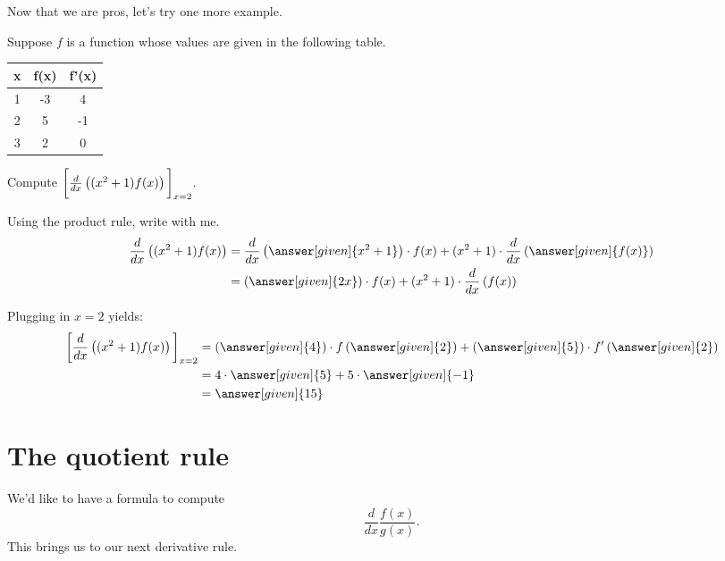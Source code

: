 \documentclass{ximera}
\begin{document}
Now that we are pros, let's try one more example.


\begin{example}
	Suppose $f$ is a function whose values are given in the following table.
	\begin{center}
		\begin{tabular}{c c c}
			\hline \hline
			x & f(x) & f'(x) \\ 
			\hline
			1 & -3 & 4\\
			2 & 5 & -1\\
			3 & 2 & 0\\
			\hline
		\end{tabular}		
	\end{center}
		
	Compute $\bigg[  \frac{d}{dx}\left( (x^2+1) f(x) \right) \bigg]_{x=2}$.
	\begin{explanation}
	Using the product rule, write with me.
	\begin{align*}
		\frac{d}{dx}\left( (x^2+1) f(x) \right) &= \frac{d}{dx} \left( \answer[given]{x^2+1} \right) \cdot f(x) + (x^2+1) \cdot \frac{d}{dx}\left( \answer[given]{f(x)} \right) \\
			&= \left( \answer[given]{2x} \right) \cdot f(x) + (x^2+1) \cdot \frac{d}{dx} \left( f(x) \right)
	\end{align*}
	
	Plugging in $x=2$ yields:
	\begin{align*}
		\eval{ \frac{d}{dx}\left( (x^2+1) f(x) \right) }_{x=2} &= \left( \answer[given]{4} \right) \cdot f\left( \answer[given]{2} \right) + \left( \answer[given]{5} \right) \cdot f'\left( \answer[given]{2} \right)\\	
			&= 4 \cdot \answer[given]{5} + 5 \cdot \answer[given]{-1}\\
			&= \answer[given]{15}
	\end{align*}
	\end{explanation}
\end{example}



\section{The quotient rule}


We'd like to have a formula to compute
\[
\frac{d}{dx} \frac{f(x)}{g(x)}.
\]
This brings us to our next derivative rule.
\end{document}
